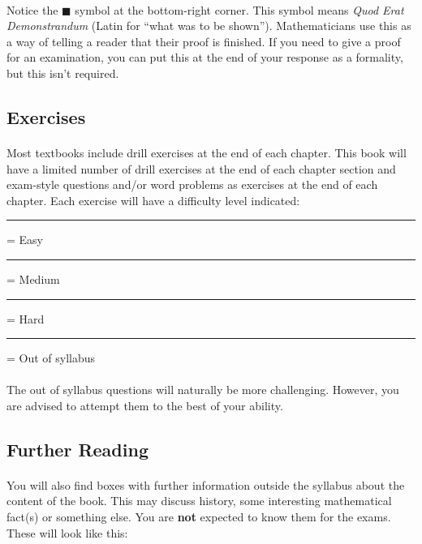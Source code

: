 \documentclass[12pt, a4paper, titlepage, twoside]{article}
\newcommand\crule[1][black]{\textcolor{#1}{\rule{0.5cm}{0.5cm}}}
\begin{document}
	\paragraph{}
	Notice the $\blacksquare$ symbol at the bottom-right corner. This symbol means \textit{Quod Erat Demonstrandum} 
	(Latin for ``what was to be shown''). Mathematicians use this as a way of telling a reader that their proof is finished.
	If you need to give a proof for an examination, you can put this at the end of your response as a formality, but this isn't
	required.
	
	\subsection*{Exercises}
	
	\paragraph{}
	Most textbooks include drill exercises at the end of each chapter. This book will have a limited number of drill exercises at the end of
	each chapter section and exam-style questions and/or word problems as exercises at the end of each chapter. Each exercise will have 
	a difficulty level indicated:\\
	
	\crule[green] = Easy \quad \crule[yellow] = Medium \quad \crule[red] = Hard \quad \crule[gray!30] = Out of syllabus

	\paragraph{}
	The out of syllabus questions will naturally be more challenging. However, you are advised to attempt them to the best of your
	ability.
	
	\subsection*{Further Reading}
	
	\paragraph{}
	You will also find boxes with further information outside the syllabus about the content of the book. This may discuss history, 
	some interesting mathematical fact(s) or something else. You are \textbf{not} expected to know them for the exams. These will look 
	like this:\\
	
\end{document}
